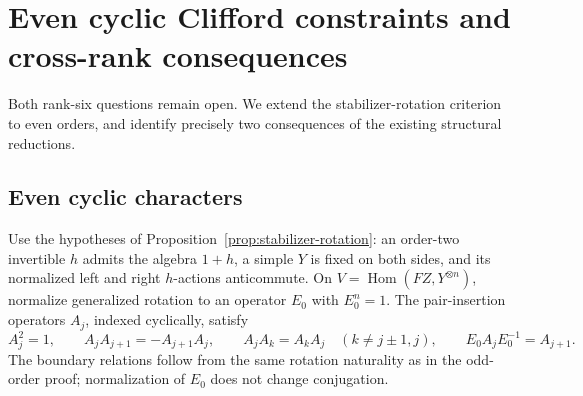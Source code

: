 \section{Even cyclic Clifford constraints and cross-rank consequences}
\label{sec:even-clifford-retry}

Both rank-six questions remain open. We extend the stabilizer-rotation
criterion to even orders, and identify precisely two consequences of the
existing structural reductions.

\subsection{Even cyclic characters}
Use the hypotheses of Proposition~\ref{prop:stabilizer-rotation}: an
order-two invertible $h$ admits the algebra $1+h$, a simple $Y$ is fixed
on both sides, and its normalized left and right $h$-actions anticommute.
On $V=\operatorname{Hom}(FZ,Y^{\otimes n})$, normalize generalized
rotation to an operator $E_0$ with $E_0^n=1$. The pair-insertion operators
$A_j$, indexed cyclically, satisfy
\[
 A_j^2=1,\qquad A_jA_{j+1}=-A_{j+1}A_j,
 \qquad A_jA_k=A_kA_j\quad(k\ne j\pm1,j),
 \qquad E_0A_jE_0^{-1}=A_{j+1}.
\]
The boundary relations follow from the same rotation naturality as in the
odd-order proof; normalization of $E_0$ does not change conjugation.


